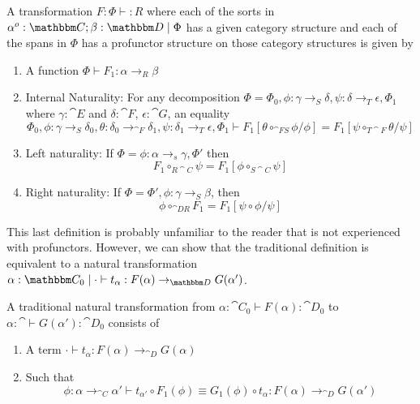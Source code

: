 \documentclass{article}
\begin{document}
\begin{definition}
  A transformation $F : \Phi \vdash : R$ where each of the sorts in
  $\alpha^o: \cat C;\beta : \cat D \pipe \Phi$ has a given category
  structure and each of the spans in $\Phi$ has a profunctor structure
  on those category structures is given by
  \begin{enumerate}
  \item A function $\Phi \vdash F_1 : \alpha \to_{R} \beta$
  \item Internal Naturality: For any decomposition $\Phi = \Phi_0,\phi
    : \gamma \to_{S} \delta,\psi : \delta \to_{T} \epsilon,\Phi_1$
    where $\gamma : \cat E$ and $\delta : \cat F$, $\epsilon : \cat
    G$, an equality
    \[ \Phi_0,\phi : \gamma\to_{S} \delta_0, \theta : \delta_0 \to_{\cat F} \delta_1,\psi : \delta_1\to_T \epsilon, \Phi_1 \vdash F_1[\theta \circ_{\cat F S} \phi/\phi] = F_1[\psi \circ_{T \cat F}\theta /\psi] \]
  \item Left naturality: If $\Phi = \phi : \alpha \to_{s} \gamma,\Phi'$
    then \[ F_1 \circ_{R\cat C} \psi = F_1[\phi \circ_{S\cat C} \psi]\]
  \item Right naturality: If $\Phi = \Phi', \phi : \gamma \to_{S}
    \beta$, then
    \[ \phi \circ_{\cat D R} F_1 = F_1[\psi \circ \phi/\psi]\]
  \end{enumerate}
\end{definition}

This last definition is probably unfamiliar to the reader that is not
experienced with profunctors.
%
However, we can show that the traditional definition is equivalent to
a natural transformation $\alpha : \cat C_0 \pipe \cdot \vdash
t_{\alpha} : F(\alpha) \to_{\cat D} G(\alpha')$.

\begin{definition}
  A traditional natural transformation from $\alpha : \cat C_0 \vdash
  F(\alpha) : \cat D_0$ to $\alpha : \cat \vdash G(\alpha') : \cat
  D_0$ consists of
  \begin{enumerate}
  \item A term $\cdot \vdash t_{\alpha} : F(\alpha) \to_{\cat D} G(\alpha)$
  \item Such that
    \[ \phi : \alpha \to_{\cat C} \alpha' \vdash t_{\alpha'} \circ F_1(\phi) \equiv G_1(\phi) \circ t_{\alpha} : F(\alpha) \to_{\cat D} G(\alpha')
    \]
  \end{enumerate}
\end{definition}
\end{document}

